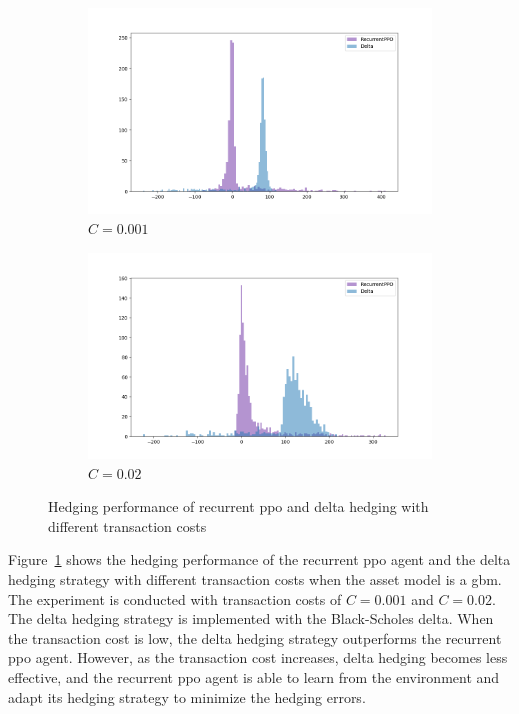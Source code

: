 \begin{figure}[ht!]
    \centering
    \begin{subfigure}{0.45\textwidth}
        \includegraphics[width=\textwidth]{./futureWork/figures/PPO_cost_001.png}
        \caption{$C = 0.001$}
    \end{subfigure}
    \hspace{1cm}
    \begin{subfigure}{0.45\textwidth}
        \includegraphics[width=\textwidth]{./futureWork/figures/PPO_cost_02.png}
        \caption{$C = 0.02$}
    \end{subfigure}
    \caption{Hedging performance of recurrent \gls{ppo} and delta hedging with different transaction costs} 
    \label{fig3:ppo_cost}
\end{figure}

Figure~\ref{fig3:ppo_cost} shows the hedging performance of the recurrent \gls{ppo} agent and the delta hedging strategy with different transaction costs when the asset model is a \gls{gbm}.
The experiment is conducted with transaction costs of $C=0.001$ and $C=0.02$.
The delta hedging strategy is implemented with the Black-Scholes delta.
When the transaction cost is low, the delta hedging strategy outperforms the recurrent \gls{ppo} agent.
However, as the transaction cost increases, delta hedging becomes less effective, and the recurrent \gls{ppo} agent is able to learn from the environment and adapt its hedging strategy to minimize the hedging errors.


